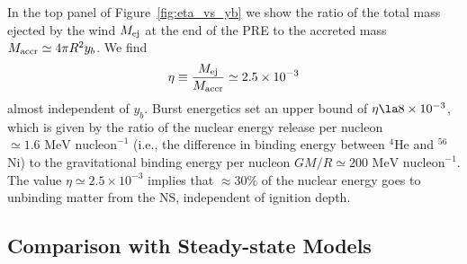 \documentclass[apj,usenatbib, iop, twocolappendix]{emulateapj}
\newcommand{\beq}{\begin{equation}}
\newcommand{\eeq}{\end{equation}}
\newcommand{\trm}[1]{\textrm{#1}}
\begin{document}
In the top panel of Figure~\ref{fig:eta_vs_yb} we show the ratio of the total mass ejected by the wind $M_{\rm ej}$ at the end of the PRE to the accreted mass $M_{\rm accr}\simeq 4\pi R^2 y_b$.   We find
\beq
\label{eq:eta}
\eta \equiv \frac{M_{\rm ej}}{M_{\rm accr}} \simeq 2.5\times10^{-3}
\eeq
almost independent of $y_b$.  Burst energetics set an upper bound of $\eta \la 8\times 10^{-3}$, which is given by the ratio of the nuclear energy release per nucleon $\simeq 1.6\trm{ MeV nucleon}^{-1}$ (i.e., the difference in binding energy  between $^4$He and $^{56}$Ni) to the gravitational binding energy per nucleon $GM/R\simeq 200\trm{ MeV nucleon}^{-1}$.  The value $\eta\simeq 2.5\times10^{-3}$ implies that $\approx 30\%$ of the nuclear energy goes to unbinding matter from the NS, independent of ignition depth.


\subsection{Comparison with Steady-state Models}
\label{sec:steady_state}
\end{document}
